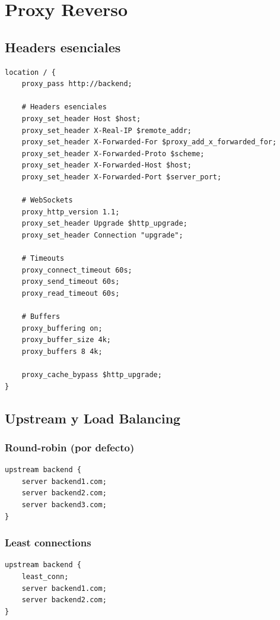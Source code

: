\documentclass[11pt,a4paper]{article}
\begin{document}
\section{Proxy Reverso}

\subsection{Headers esenciales}

\begin{lstlisting}[caption=Configuración completa de proxy]
location / {
    proxy_pass http://backend;
    
    # Headers esenciales
    proxy_set_header Host $host;
    proxy_set_header X-Real-IP $remote_addr;
    proxy_set_header X-Forwarded-For $proxy_add_x_forwarded_for;
    proxy_set_header X-Forwarded-Proto $scheme;
    proxy_set_header X-Forwarded-Host $host;
    proxy_set_header X-Forwarded-Port $server_port;
    
    # WebSockets
    proxy_http_version 1.1;
    proxy_set_header Upgrade $http_upgrade;
    proxy_set_header Connection "upgrade";
    
    # Timeouts
    proxy_connect_timeout 60s;
    proxy_send_timeout 60s;
    proxy_read_timeout 60s;
    
    # Buffers
    proxy_buffering on;
    proxy_buffer_size 4k;
    proxy_buffers 8 4k;
    
    proxy_cache_bypass $http_upgrade;
}
\end{lstlisting}

\subsection{Upstream y Load Balancing}

\subsubsection{Round-robin (por defecto)}
\begin{lstlisting}
upstream backend {
    server backend1.com;
    server backend2.com;
    server backend3.com;
}
\end{lstlisting}

\subsubsection{Least connections}
\begin{lstlisting}
upstream backend {
    least_conn;
    server backend1.com;
    server backend2.com;
}
\end{lstlisting}
\end{document}
